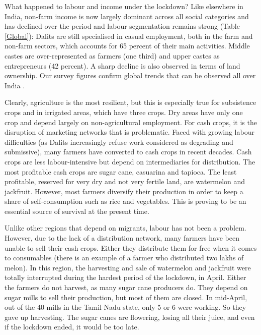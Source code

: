 \documentclass[a4paper, 11pt, onecolumn]{article}
\begin{document}
What happened to labour and income under the lockdown? Like elsewhere in India, non-farm income is now largely dominant across all social categories and has declined over the period and labour segmentation remains strong (Table \ref{Global}): Dalits are still specialised in casual  employment, both in the farm and non-farm sectors, which accounts for 65 percent of their main activities.
Middle castes are over-represented as farmers (one third) and upper castes as entrepreneurs (42 percent). 
A sharp decline is also observed in terms of land ownership. Our survey figures confirm global trends that can be observed all over India \citep{Lerche2009, Himanshu2011, Landy2018}. 



Clearly, agriculture is the most resilient, but this is especially true for subsistence crops and in irrigated areas, which have three crops.
Dry areas have only one crop and depend largely on non-agricultural employment. 
For cash crops, it is the disruption of marketing networks that is problematic. 
Faced with growing labour difficulties (as Dalits increasingly refuse work considered as degrading and submissive), many farmers have converted to cash crops in recent decades. 
Cash crops are less labour-intensive but depend on intermediaries for distribution. 
The most profitable cash crops are sugar cane, casuarina and tapioca. 
The least profitable, reserved for very dry and not very fertile land, are watermelon and jackfruit. 
However, most farmers diversify their production in order to keep a share of self-consumption such as rice and vegetables. 
This is proving to be an essential source of survival at the present time.

Unlike other regions that depend on migrants, labour has not been a problem. 
However, due to the lack of a distribution network, many farmers have been unable to sell their cash crops. 
Either they distribute them for free when it comes to consumables (there is an example of a farmer who distributed two lakhs of melon). 
In this region, the harvesting and sale of watermelon and jackfruit were totally interrupted during the hardest period of the lockdown, in April. 
Either the farmers do not harvest, as many sugar cane producers do. 
They depend on sugar mills to sell their production, but most of them are closed. 
In mid-April, out of the 40 mills in the Tamil Nadu state, only 5 or 6 were working. 
So they gave up harvesting. 
The sugar canes are flowering, losing all their juice, and even if the lockdown ended, it would be too late. 
\end{document}
